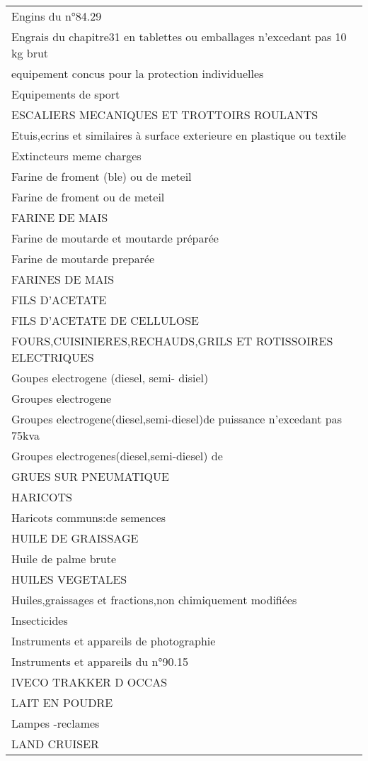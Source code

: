 \documentclass[
]{book}
\begin{document}
\begin{longtable}[t]{l}
Engins du n°84.29\\
Engrais du chapitre31 en tablettes ou emballages n'excedant pas 10 kg brut\\
\addlinespace
equipement concus pour la protection individuelles\\
Equipements de sport\\
ESCALIERS MECANIQUES ET TROTTOIRS ROULANTS\\
Etuis,ecrins et similaires à surface exterieure en plastique ou textile\\
Extincteurs meme charges\\
\addlinespace
Farine de froment (ble) ou de meteil\\
Farine de froment ou de meteil\\
FARINE DE MAIS\\
Farine de moutarde et moutarde préparée\\
Farine de moutarde preparée\\
\addlinespace
FARINES DE MAIS\\
FILS D'ACETATE\\
FILS D'ACETATE DE CELLULOSE\\
FOURS,CUISINIERES,RECHAUDS,GRILS ET ROTISSOIRES  ELECTRIQUES\\
Goupes electrogene (diesel, semi- disiel)\\
\addlinespace
Groupes electrogene\\
Groupes electrogene(diesel,semi-diesel)de puissance n'excedant pas 75kva\\
Groupes electrogenes(diesel,semi-diesel) de\\
GRUES SUR PNEUMATIQUE\\
HARICOTS\\
\addlinespace
Haricots communs:de semences\\
HUILE DE GRAISSAGE\\
Huile de palme brute\\
HUILES VEGETALES\\
Huiles,graissages et fractions,non chimiquement modifiées\\
\addlinespace
Insecticides\\
Instruments et appareils de photographie\\
Instruments et appareils du n°90.15\\
IVECO TRAKKER D OCCAS\\
LAIT EN POUDRE\\
\addlinespace
Lampes -reclames\\
LAND CRUISER\\

\end{longtable}
\end{document}
